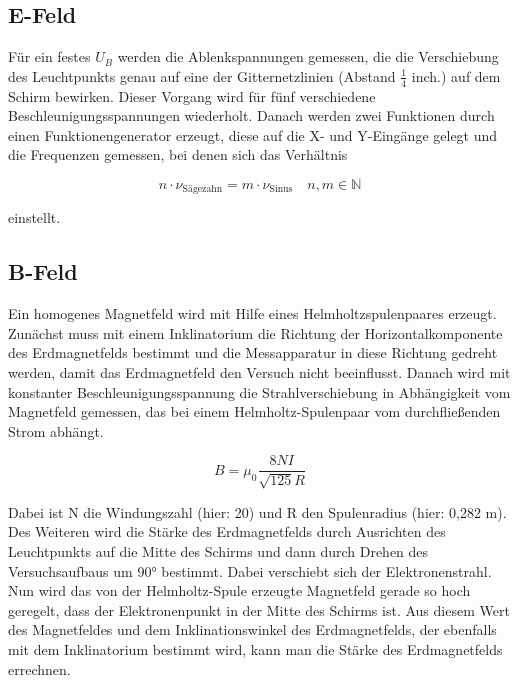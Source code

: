 \newpage

\subsection{E-Feld}

Für ein festes $U_B$ werden die Ablenkspannungen gemessen, die die Verschiebung des Leuchtpunkts genau auf eine der Gitternetzlinien (Abstand $\frac{1}{4}$ inch.) auf dem Schirm bewirken. Dieser Vorgang wird für
fünf verschiedene Beschleunigungsspannungen wiederholt.
Danach werden zwei Funktionen durch einen Funktionengenerator erzeugt, diese auf die X- und Y-Eingänge gelegt und die Frequenzen gemessen, bei denen sich das Verhältnis 

\begin{equation}
\label{eq:Theorie_freqVerhältnis}
n \cdot \nu_\text{Sägezahn} = m \cdot \nu_\text{Sinus} \quad n, m\in\mathbb{N}
\end{equation}

einstellt.

\subsection{B-Feld}

Ein homogenes Magnetfeld wird mit Hilfe eines Helmholtzspulenpaares erzeugt. Zunächst muss
mit einem Inklinatorium die Richtung der Horizontalkomponente des Erdmagnetfelds bestimmt und die
Messapparatur in diese Richtung gedreht werden, damit das Erdmagnetfeld den Versuch nicht beeinflusst.
Danach wird mit konstanter Beschleunigungsspannung die Strahlverschiebung in Abhängigkeit vom Magnetfeld gemessen, das bei einem Helmholtz-Spulenpaar vom durchfließenden Strom abhängt.

\begin{equation}
\label{eq:Theorie_Magnetfeld}
B = \mu_0\frac{8 N I}{\sqrt{125}R}
\end{equation}

Dabei ist N die Windungszahl (hier: 20) und R den Spulenradius (hier: 0,282 m).
Des Weiteren wird die Stärke des Erdmagnetfelds durch Ausrichten des Leuchtpunkts auf die Mitte des Schirms und dann durch Drehen des Versuchsaufbaus um 90° bestimmt. Dabei verschiebt sich der Elektronenstrahl. Nun wird das von der Helmholtz-Spule erzeugte Magnetfeld
gerade so hoch geregelt, dass der Elektronenpunkt in der Mitte des Schirms ist. Aus diesem Wert des Magnetfeldes und dem Inklinationswinkel des Erdmagnetfelds, der ebenfalls mit dem Inklinatorium bestimmt wird, kann man die Stärke des Erdmagnetfelds errechnen.


